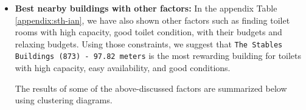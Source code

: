 \begin{itemize}


\item \textbf{Best nearby buildings with other factors:} In the appendix Table \ref{appendix:sth-ian}, we have also shown other factors such as finding toilet rooms with high capacity, good toilet condition, with their budgets and relaxing budgets. Using those constraints, we suggest that \texttt{The Stables Buildings (873) - 97.82 meters} is the most rewarding building for toilets with high capacity, easy availability, and good conditions.

The results of some of the above-discussed factors are summarized below using clustering diagrams.


\end{itemize}
